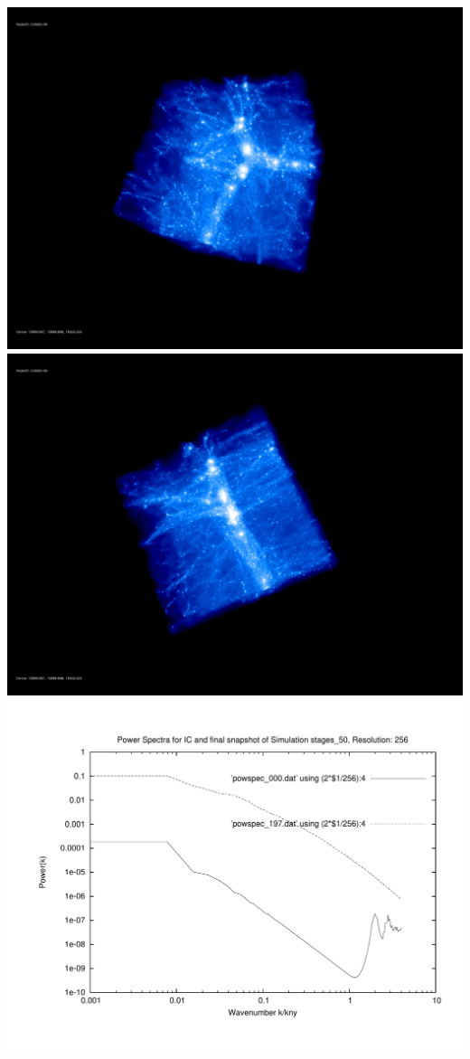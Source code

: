 \includegraphics[scale=0.1]{r256/h100/stages_50/rotate_00074.jpg} 
\includegraphics[scale=0.1]{r256/h100/stages_50/rotate_00131.jpg}  \\

\includegraphics[scale=0.5]{r256/h100/stages_50/plot_powspec_stages_50}

